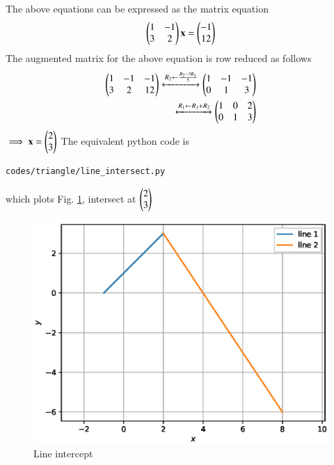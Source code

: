 \begin{enumerate}[label=\arabic*.,ref=\thesubsection.\theenumi]
The above equations can be expressed as the matrix equation
\begin{align}
\begin{pmatrix}1 & -1\\3 & 2\end{pmatrix} \mathbf{x} = \begin{pmatrix}-1\\12\end{pmatrix}
\end{align}
%
The augmented matrix for the above equation is row reduced as follows
\begin{align}
\begin{pmatrix}1 & -1 & -1\\3 & 2 & 12\end{pmatrix} 
\xleftrightarrow {R_2\leftarrow \frac{R_2-3R_1}{5}}\begin{pmatrix}1 & -1 & -1\\0 & 1 & 3\end{pmatrix} 
\\
\xleftrightarrow {R_1\leftarrow R_1 + R_2}\begin{pmatrix}1 & 0 & 2\\0 & 1 & 3\end{pmatrix} 
\label{eq:line_aug}
\end{align}
%
$\implies \mathbf{x}=\begin{pmatrix}2\\3\end{pmatrix}$
The equivalent python code is
%
\begin{lstlisting}
codes/triangle/line_intersect.py
\end{lstlisting}
%
which plots Fig. \ref{fig:line_intercept}, intersect at $\begin{pmatrix}2\\3\end{pmatrix}$
%
\begin{figure}[!ht]
\includegraphics[width=\columnwidth]{./figs/triangle/line_intercept.eps}
\caption{Line intercept}
\label{fig:line_intercept}
\end{figure}


\end{enumerate}
